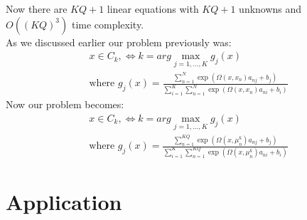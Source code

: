 \documentclass[conference]{IEEEtran}
\begin{document}
    Now there are $KQ+1$ linear equations with $KQ+1$ unknowns and $O((KQ)^3)$ time complexity. \\
    As we discussed earlier our problem previously was:
    \begin{align*}
        & x \in C_{k}, \Leftrightarrow k= arg \max_{j=1,\ldots,K} g_{j}(x) \\
        & \text{where } g_{j}(x) = \frac{\sum_{n=1}^{N}\exp(\Omega(x,x_{n})a_{nj} + b_{j})}{\sum_{i=1}^{K} \sum_{n=1}^{N}\exp(\Omega(x,x_{n})a_{ni} + b_{i})}
    \end{align*}
    Now our problem becomes:
    \begin{align*}
        & x \in C_{k}, \Leftrightarrow k= arg \max_{j=1,\ldots,K} g_{j}(x) \\
        & \text{where } g_{j}(x) = \frac{\sum_{n=1}^{KQ}\exp(\Omega(x,\mu_{n}^{k})a_{nj} + b_{j})}{\sum_{i=1}^{K} \sum_{n=1}^{KQ}\exp(\Omega(x,\mu_{n}^{k})a_{ni} + b_{i})}
    \end{align*}


    \section{Application}\label{sec:application}
\end{document}
